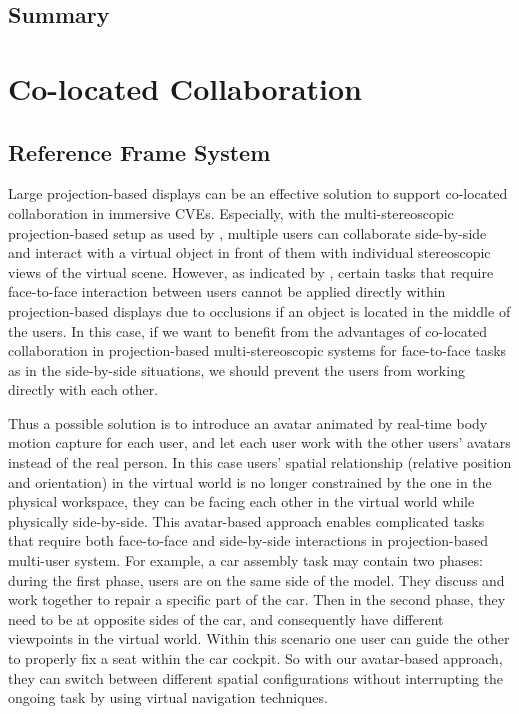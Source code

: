 \subsection{Summary}

\section{Co-located Collaboration}
\subsection{Reference Frame System}
Large projection-based displays can be an effective solution to support co-located collaboration in immersive CVEs. Especially, with the multi-stereoscopic projection-based setup as used by \citet{Salzmann2009VRPointing}, multiple users can collaborate side-by-side and interact with a virtual object in front of them with individual stereoscopic views of the virtual scene. However, as indicated by \citet{Salzmann2009CIC}, certain tasks that require face-to-face interaction between users cannot be applied directly within projection-based displays due to occlusions if an object is located in the middle of the users. In this case, if we want to benefit from the advantages of co-located collaboration in projection-based multi-stereoscopic systems for face-to-face tasks as in the side-by-side situations, we should prevent the users from working directly with each other.

Thus a possible solution is to introduce an avatar animated by real-time body motion capture for each user, and let each user work with the other users' avatars instead of the real person. In this case users' spatial relationship (relative position and orientation) in the virtual world is no longer constrained by the one in the physical workspace, they can be facing each other in the virtual world while physically side-by-side. This avatar-based approach enables complicated tasks that require both face-to-face and side-by-side interactions in projection-based multi-user system. For example, a car assembly task may contain two phases: during the first phase, users are on the same side of the model. They discuss and work together to repair a specific part of the car. Then in the second phase, they need to be at opposite sides of the car, and consequently have different viewpoints in the virtual world. Within this scenario one user can guide the other to properly fix a seat within the car cockpit. So with our avatar-based approach, they can switch between different spatial configurations without interrupting the ongoing task by using virtual navigation techniques.

